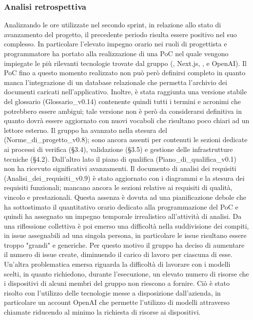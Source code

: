 \newpage
\subsubsection{Analisi retrospettiva}
Analizzando le ore utilizzate nel secondo sprint, in relazione allo stato di avanzamento del progetto, il precedente periodo risulta essere positivo nel suo complesso. In particolare l'elevato impegno orario nei ruoli di progettista e programmatore ha portato alla realizzazione di una PoC nel quale vengono impiegate le più rilevanti tecnologie trovate dal gruppo (, Next.js, ,  e OpenAI). Il PoC fino a questo momento realizzato non può però definirsi completo in quanto manca l'integrazione di un database relazionale che permetta l'archivio dei documenti caricati nell'applicativo. Inoltre, è stata raggiunta una versione stabile del glossario (Glossario\_v0.14) contenente quindi tutti i termini e acronimi che potrebbero essere ambigui; tale versione non è però da considerarsi definitiva in quanto dovrà essere aggiornato con nuovi vocaboli che risultano poco chiari ad un lettore esterno. Il gruppo ha avanzato nella stesura del  (Norme\_di\_progetto\_v0.8); sono ancora assenti per contenuti le sezioni dedicate ai processi di verifica (§3.4),  validazione (§3.5) e gestione delle infrastrutture tecniche (§4.2). Dall'altro lato il piano di qualifica (Piano\_di\_qualifica\_v0.1) non ha ricevuto significativi avanzamenti. Il documento di analisi dei requisiti (Analisi\_dei\_requisiti\_v0.9) è stato aggiornato con i diagrammi  e la stesura dei requisiti funzionali; mancano ancora le sezioni relative ai requisiti di qualità, vincolo e prestazionali. Questa assenza è dovuta ad una pianificazione debole che ha sottostimato il quantitativo orario dedicato alla programmazione del PoC e quindi ha assegnato un impegno temporale irrealistico all'attività di analisi. Da una riflessione collettiva è poi emerso una difficoltà nella suddivisione dei compiti, in issue assegnabili ad una singola persona, in particolare le issue risultano essere troppo "grandi" e generiche. Per questo motivo il gruppo ha deciso di aumentare il numero di issue create, diminuendo il carico di lavoro per ciascuna di esse. Un'altra problematica emersa riguarda la difficoltà di lavorare con i modelli scelti, in quanto richiedono, durante l'esecuzione, un elevato numero di risorse che i dispositivi di alcuni membri del gruppo non riescono a fornire. Ciò è stato risolto con l'utilizzo delle tecnologie messe a disposizione dall'azienda, in particolare un account OpenAI che permette l'utilizzo di modelli attraverso chiamate  riducendo al minimo la richiesta di risorse ai dispositivi.
\newpage

